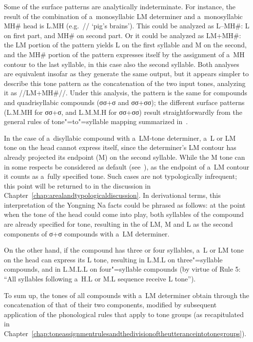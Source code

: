 Some of the surface patterns are analytically indeterminate. For instance, the result of the
combination of a~monosyllabic LM determiner and a~monosyllabic MH\# head is L.MH
(e.g.~// ‘pig’s brains’). This could be analyzed as L--MH\#: L on first part, and
MH\# on second part. Or it could be analyzed as LM+MH\#: the LM portion of the pattern yields L on
the first syllable and M on the second, and the MH\# portion of the pattern expresses itself by the assignment of a~MH contour to the last syllable,
in this case also the second syllable. Both analyses are equivalent insofar as they generate the same
output, but it appears simpler to describe this tone pattern as the concatenation of the two input
tones, analyzing it as //LM+MH\#//. Under this analysis, the pattern is the same for  compounds and
quadrisyllabic compounds (σσ+σ and σσ+σσ); the different surface patterns (L.M.MH for σσ+σ, and
L.M.M.H for σσ+σσ) result straightforwardly from the general rules of tone"=to"=syllable mapping
summarized in~.

In the case of a~disyllabic compound with a~LM-tone determiner, a~L or LM tone on the head cannot express itself, since the
determiner’s LM contour has already projected its endpoint (M) on the second syllable. While the M
tone can in some respects be considered as default (see~), as the endpoint
of a~LM contour it counts as a~fully specified tone. Such cases are not typologically infrequent;
this point will be returned to in the discussion in Chapter~\ref{chap:arealandtypologicaldiscussion}. In derivational terms,
this interpretation of the Yongning Na facts could be phrased as follows: at the point when the tone
of the head could come into play, both syllables of the compound are already specified for tone,
resulting in the  of LM, M and L as the second components of σ+σ compounds with
a~LM determiner.

On the other hand, if the compound has three or four syllables, a~L or LM tone on the head can
express its L tone, resulting in L.M.L on three"=syllable compounds, and in L.M.L.L on four"=syllable
compounds (by virtue of Rule 5: “All syllables following a~H.L or M.L sequence receive L tone”).

To sum up, the tones of all compounds with a~LM determiner obtain through the concatenation of that
of their two components, modified by subsequent application of the phonological rules that apply to tone
groups (as recapitulated in Chapter~\ref{chap:toneassignmentrulesandthedivisionoftheutteranceintotonegroups}).

